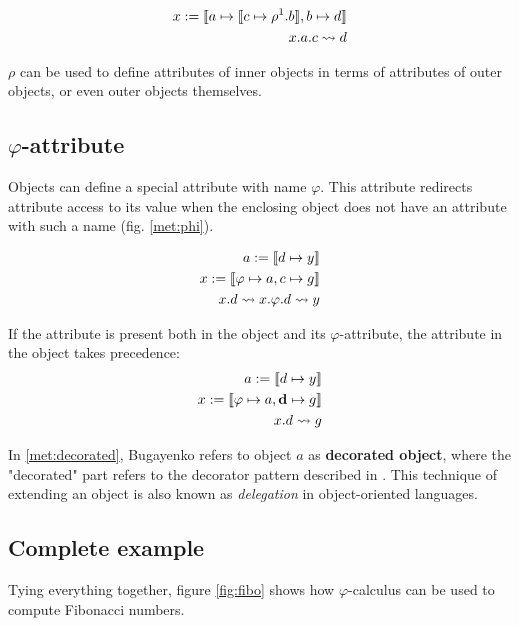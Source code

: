 \begin{align}
    \label{met:complex}
    x := \llbracket a \mapsto \llbracket c \mapsto \rho^1.b \rrbracket, b \mapsto d \rrbracket \\
    x.a.c \rightsquigarrow d
\end{align}

$\rho$ can be used to define attributes of inner objects in terms of attributes of outer objects, or even outer objects themselves.

\subsection{$\varphi$-attribute}
Objects can define a special attribute with name $\varphi$. This attribute redirects attribute access to its value when the enclosing object does not have an attribute with such a name (fig. \ref{met:phi}).

\begin{align}
    \label{met:phi}
    a := \llbracket d \mapsto y \rrbracket                    \\
    \label{met:decorated}
    x := \llbracket \varphi \mapsto a, c \mapsto g \rrbracket \\
    x.d \rightsquigarrow x.\varphi.d \rightsquigarrow y
\end{align}

If the attribute is present both in the object and its $\varphi$-attribute, the attribute in the object takes precedence:
\begin{align*}
    a := \llbracket d \mapsto y \rrbracket                             \\
    x := \llbracket \varphi \mapsto a, \textbf{d} \mapsto g \rrbracket \\
    x.d \rightsquigarrow g
\end{align*}

In \ref{met:decorated}, Bugayenko \cite{eolang} refers to object $a$ as \textbf{decorated object}, where the "decorated" part refers to the decorator pattern described in \cite[Chapter 4]{GOFPatterns}. This technique of extending an object is also known as \textit{delegation} \cite{raiha_delegation:_1994} in object-oriented languages.

\subsection{Complete example}
Tying everything together, figure \ref{fig:fibo} shows how $\varphi$-calculus can be used to compute Fibonacci numbers.


